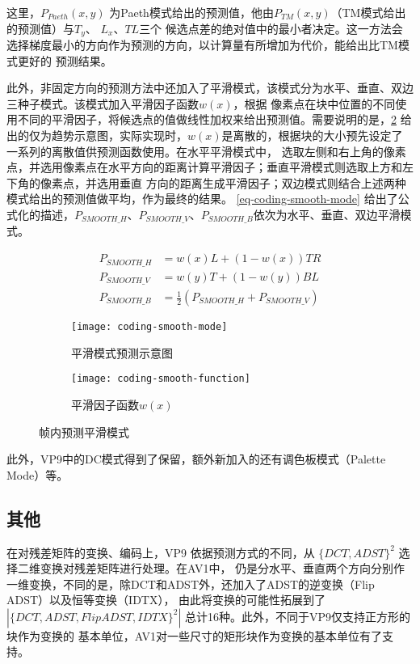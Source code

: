 这里，$P_{Paeth}(x, y)$ 为Paeth模式给出的预测值，他由$P_{TM}(x,y)$（TM模式给出的预测值）与$T_y$、 $L_x$、$TL$三个
候选点差的绝对值中的最小者决定。这一方法会选择梯度最小的方向作为预测的方向，以计算量有所增加为代价，能给出比TM模式更好的
预测结果。

此外，非固定方向的预测方法中还加入了平滑模式，该模式分为水平、垂直、双边三种子模式。该模式加入平滑因子函数$w(x)$，根据
像素点在块中位置的不同使用不同的平滑因子，将候选点的值做线性加权来给出预测值。需要说明的是，\ref{fig:coding-smooth-function}
给出的仅为趋势示意图，实际实现时，$w(x)$是离散的，根据块的大小预先设定了一系列的离散值供预测函数使用。在水平平滑模式中，
选取左侧和右上角的像素点，并选用像素点在水平方向的距离计算平滑因子；垂直平滑模式则选取上方和左下角的像素点，并选用垂直
方向的距离生成平滑因子；双边模式则结合上述两种模式给出的预测值做平均，作为最终的结果。 \ref{eq-coding-smooth-mode}
给出了公式化的描述，$P_{SMOOTH\_H}$、$P_{SMOOTH\_V}$、$P_{SMOOTH\_B}$依次为水平、垂直、双边平滑模式。

\begin{equation}
\label{eq-coding-smooth-mode}
\begin{split}
P_{SMOOTH\_H} & = w(x)L + (1-w(x))TR \\
P_{SMOOTH\_V} & = w(y)T + (1-w(y))BL \\
P_{SMOOTH\_B} & = \frac12(P_{SMOOTH\_H} + P_{SMOOTH\_V})
\end{split}
\end{equation}

\begin{figure}[H]
  \centering%
  \begin{subfigure}{0.43\textwidth}
    \centering
    \texttt{[image: coding-smooth-mode]}
    \caption{平滑模式预测示意图}
  \end{subfigure}%
  \hspace{2em}%
  \begin{subfigure}{0.43\textwidth}
    \centering
    \texttt{[image: coding-smooth-function]}
    \caption{平滑因子函数$w(x)$}
    \label{fig:coding-smooth-function}
  \end{subfigure}
  \caption{帧内预测平滑模式}
\end{figure}

此外，VP9中的DC模式得到了保留，额外新加入的还有调色板模式（Palette Mode）等。

\subsection{其他}

在对残差矩阵的变换、编码上，VP9 依据预测方式的不同，从 $\{DCT, ADST\}^2$ 选择二维变换对残差矩阵进行处理。在AV1中，
仍是分水平、垂直两个方向分别作一维变换，不同的是，除DCT和ADST外，还加入了ADST的逆变换（Flip ADST）以及恒等变换（IDTX），
由此将变换的可能性拓展到了 $|\{DCT, ADST, FlipADST, IDTX\}^2|$ 总计16种。此外，不同于VP9仅支持正方形的块作为变换的
基本单位，AV1对一些尺寸的矩形块作为变换的基本单位有了支持。

